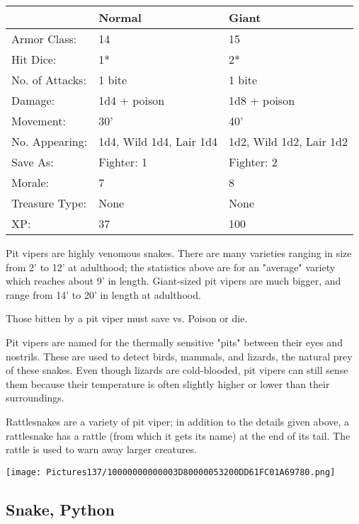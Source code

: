 \documentclass[a4paper,twoside,openany,10pt]{book}
\begin{document}
\begin{multicols}{2}
\begin{tabularx}{0.50\textwidth}{@{}XXX@{}}
& Normal & Giant \\\hline
Armor Class: & 14 & 15 \\\hline
Hit Dice: & 1* & 2* \\\hline
No. of Attacks: & 1 bite & 1 bite \\\hline
Damage: & 1d4 + poison & 1d8 + poison \\\hline
Movement: & 30' & 40' \\\hline
No. Appearing: & 1d4, Wild 1d4, Lair 1d4 & 1d2, Wild 1d2, Lair 1d2 \\\hline
Save As: & Fighter: 1 & Fighter: 2 \\\hline
Morale: & 7 & 8 \\\hline
Treasure Type: & None & None \\\hline
XP: & 37 & 100 \\\hline
\end{tabularx}

Pit vipers are highly venomous snakes. There are many varieties ranging in size from 2' to 12' at adulthood; the statistics above are for an "average" variety which reaches about 9' in length. Giant-sized pit vipers are much bigger, and range from 14' to 20' in length at adulthood.

Those bitten by a pit viper must save vs. Poison or die.

Pit vipers are named for the thermally sensitive "pits" between their eyes and nostrils. These are used to detect birds, mammals, and lizards, the natural prey of these snakes. Even though lizards are cold-blooded, pit vipers can still sense them because their temperature is often slightly higher or lower than their surroundings.

Rattlesnakes are a variety of pit viper; in addition to the details given above, a rattlesnake has a rattle (from which it gets its name) at the end of its tail. The rattle is used to warn away larger creatures. 


\begin{center} \texttt{[image: Pictures137/10000000000003D80000053200DD61FC01A69780.png]} \end{center}


\subsection*{Snake, Python}\label{snake-python}


\end{multicols}
\end{document}
